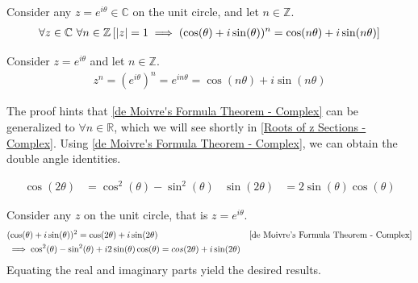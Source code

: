\documentclass[12pt, english]{book}
\makeatletter
\renewenvironment{proof}[1][\proofname]{\par
	\pushQED{\qed}%
	\normalfont \topsep6\p@\@plus6\p@\relax
	\list{}{%
		\settowidth{\leftmargin}{\itshape\proofname:\hskip\labelsep}%
		\setlength{\labelwidth}{0pt}%
		\setlength{\itemindent}{-\leftmargin}%
		}%
	\item[\hskip\labelsep\itshape#1\@addpunct{:}]\ignorespaces
	}{\popQED\endlist\@endpefalse}
\makeatother
\begin{document}
	\begin{theorem}
		Consider any $z = e^{i \theta} \in \mathbb{C}$ on the unit circle, and let $n \in \mathbb{Z}$.
		\begin{align*}
			\forall z\in \mathbb{C} \ \forall n \in \mathbb{Z}
			\left[\abs{z} = 1 \implies (\cos(\theta) + i\sin(\theta))^n = \cos(n \theta) + i\sin(n \theta)\right]
		\end{align*}
		\label{de Moivre's Formula Theorem - Complex}
	\end{theorem}
	\begin{proof}
		Consider $z = e^{i \theta}$ and let $n \in \mathbb{Z}$. 
		\begin{align*}
			z^n = (e^{i \theta})^n = e^{in\theta} = \cos(n\theta) + i\sin(n\theta)
		\end{align*}
	\end{proof}

	The proof hints that \cref{de Moivre's Formula Theorem - Complex} can be generalized to $\forall n \in \mathbb{R}$, which we will see shortly in \cref{Roots of z Sections - Complex}. Using \cref{de Moivre's Formula Theorem - Complex}, we can obtain the double angle identities.
	
	\begin{corollary}
		\begin{align*}
			\cos(2 \theta) &= \cos^2(\theta) - \sin^2(\theta) 
				& \sin(2\theta) &= 2\sin(\theta)\cos(\theta)
		\end{align*}
	\end{corollary}
	\begin{proof}
		Consider any $z$ on the unit circle, that is $z=e^{i\theta}$.
		\begin{align*}
			&(\cos(\theta) + i \sin(\theta))^2 = \cos(2\theta) + i \sin(2\theta)
				&\text{\Cref{de Moivre's Formula Theorem - Complex}} \\
			&\implies \cos^2(\theta) - \sin^2(\theta) + i2\sin(\theta)\cos(\theta) = cos(2\theta) + i\sin(2\theta) 
		\end{align*}
		Equating the real and imaginary parts yield the desired results. 
	\end{proof}
\end{document}
